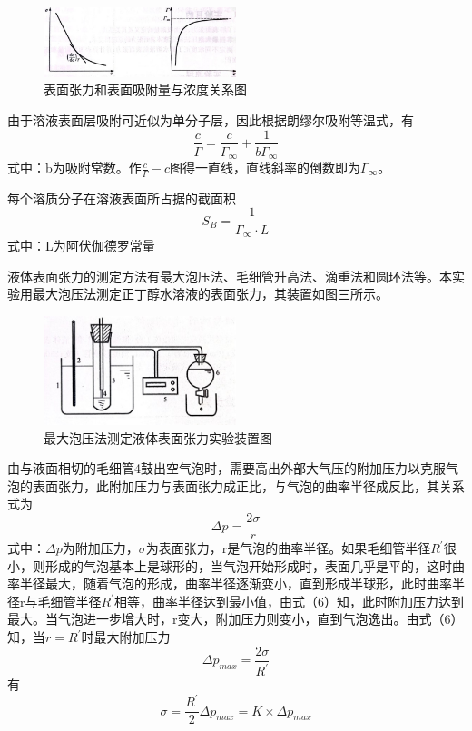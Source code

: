 \documentclass[hyperref,a4paper,UTF8]{ctexart}
\begin{document}
\begin{figure}[H]
    \centering
    \includegraphics[width=0.5\textwidth,height=0.3\textwidth]{i.jpg}
    \caption{表面张力和表面吸附量与浓度关系图}
    \label{fig:my_label}
\end{figure}



由于溶液表面层吸附可近似为单分子层，因此根据朗缪尔吸附等温式，有
\begin{equation}
    \frac{c}{\Gamma}=\frac{c}{\Gamma _{\infty}}  +\frac{1}{b\Gamma _{\infty}}
\end{equation}
式中：b为吸附常数。作$\frac{c}{\Gamma}-c$图得一直线，直线斜率的倒数即为$\Gamma_{\infty}$。


每个溶质分子在溶液表面所占据的截面积
\begin{equation}
    S_{B}=\frac{1}{\Gamma_{\infty}\cdot L}
\end{equation}
式中：L为阿伏伽德罗常量


液体表面张力的测定方法有最大泡压法、毛细管升高法、滴重法和圆环法等。本实验用最大泡压法测定正丁醇水溶液的表面张力，其装置如图三所示。
\begin{figure}[H]
    \centering
    \includegraphics[width=0.5\textwidth]{2.jpg}
    \caption{最大泡压法测定液体表面张力实验装置图}
    \label{fig:my_label}
\end{figure}


由与液面相切的毛细管4鼓出空气泡时，需要高出外部大气压的附加压力以克服气泡的表面张力，此附加压力与表面张力成正比，与气泡的曲率半径成反比，其关系式为
\begin{equation}
    \Delta p=\frac{2\sigma}{r} 
\end{equation}
式中：$\Delta p$为附加压力，$\sigma$为表面张力，r是气泡的曲率半径。如果毛细管半径$R^{'}$很小，则形成的气泡基本上是球形的，当气泡开始形成时，表面几乎是平的，这时曲率半径最大，随着气泡的形成，曲率半径逐渐变小，直到形成半球形，此时曲率半径r与毛细管半径$R^{'}$相等，曲率半径达到最小值，由式（6）知，此时附加压力达到最大。当气泡进一步增大时，r变大，附加压力则变小，直到气泡逸出。由式（6）知，当$r=R^{'}$时最大附加压力
\begin{equation}
    \Delta p_{max}=\frac{2\sigma}{R^{'}}
\end{equation}
有
\begin{equation}
    \sigma=\frac{R^{'}}{2} \Delta p_{max}=K\times \Delta p_{max}
\end{equation}
\end{document}
